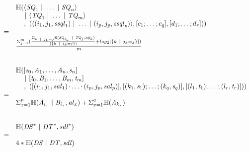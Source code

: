 \documentclass[acmsmall,screen,anonymous]{acmart}
\begin{document}
\begin{centering}
  \[
    \begin{array}{rl}
      & \mathbb{H}(\langle\mathit{SQ}_1 ~|~ \ldots ~|~ \mathit{SQ}_n\rangle\\
      & \hspace*{1em}~|~
        \langle\mathit{TQ}_1 ~|~ \ldots ~|~ \mathit{TQ}_m\rangle\\
      & \hspace*{1.21em},~(\langle(i_1,j_1,\mathit{ssql}_1)~|~
        \ldots~|~
        (i_p,j_p,\mathit{ssql}_p)\rangle
        ,[ c_1;\ldots;c_q ]
        ,[ d_1;\ldots;d_r ]))\\
      =\\
      & \frac{\Sigma_{j=1}^m(\frac{\Sigma_{k~|~ j_k = j}
        \mathbb{H}(\mathit{SQ}_{i_k}~|~\mathit{TQ}_j,\mathit{sql}_k)}{|\{k~|~
        j_k = j\}|} + log_2|\{k~|~ j_k = j\}|)}{m}\\\\
      \\
      
      & \mathbb{H}(
        [\mathit{s}_0,\mathit{A}_1,\ldots,\mathit{A}_n,\mathit{s}_n]\\
      & \hspace*{1em}~|~
        [\mathit{t}_0,\mathit{B}_1,\ldots,\mathit{B}_m,\mathit{t}_m]\\
      & \hspace*{1.21em},~
        ([(i_1,j_1,\mathit{sal}_1)\mkern-1mu\cdot\mkern-1mu
        \ldots\mkern-1mu\cdot\mkern-1mu
        (i_p,j_p,\mathit{sal}_p)]
        ,[ (k_1,\mathit{s}_1);\ldots;(k_q,\mathit{s}_q) ]
        ,[ (l_1,\mathit{t}_1);\ldots;(l_r,\mathit{t}_r) ]))\\
      =\\
      & \Sigma_{x=1}^p\mathbb{H}(\mathit{A}_{i_x} ~|~ \mathit{B}_{i_x},\mathit{al}_x) +
        \Sigma_{x=1}^q\mathbb{H}(\mathit{A}_{k_x})\\\\
      \\
      
      
      & \mathbb{H}({\mathit{DS}}^* ~|~ {\mathit{DT}}^*,{\mathit{sdl}}^*)\\
      =\\
      & 4*\mathbb{H}(\mathit{DS}~|~\mathit{DT},\mathit{sdl})
    \end{array}
  \]
\end{centering}

\end{document}
